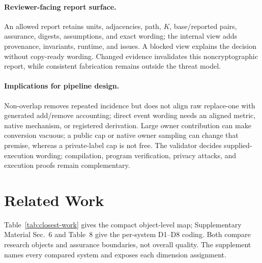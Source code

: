 \documentclass[letterpaper]{article} %
\begin{document}
\paragraph{Reviewer-facing report surface.}
An allowed report retains units, adjacencies, path, $K$, base/reported pairs, assurance, digests, assumptions, and exact wording; the internal view adds provenance, invariants, runtime, and issues. A blocked view explains the decision without copy-ready wording. Changed evidence invalidates this noncryptographic report, while consistent fabrication remains outside the threat model.

\paragraph{Implications for pipeline design.}
Non-overlap removes repeated incidence but does not align raw replace-one with generated add/remove accounting; direct event wording needs an aligned metric, native mechanism, or registered derivation. Large owner contribution can make conversion vacuous; a public cap or native owner sampling can change that premise, whereas a private-label cap is not free. The validator decides supplied-execution wording; compilation, program verification, privacy attacks, and execution proofs remain complementary.

\section{Related Work}

Table~\ref{tab:closest-work} gives the compact object-level map; Supplementary Material Sec.~6 and Table~8 give the per-system D1--D8 coding. Both compare research objects and assurance boundaries, not overall quality. The supplement names every compared system and exposes each dimension assignment.
\end{document}
